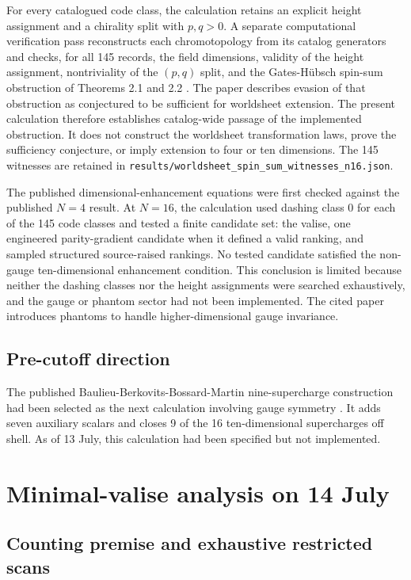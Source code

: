 \documentclass[11pt]{article}
\newcommand{\pathcode}[1]{\nolinkurl{#1}}
\begin{document}
For every catalogued code class, the calculation retains an explicit height
assignment and a chirality split with $p,q>0$.  A separate computational
verification pass reconstructs each chromotopology from its catalog generators
and checks, for all 145 records, the field dimensions, validity of the height
assignment, nontriviality of the $(p,q)$ split, and the Gates-H\"ubsch spin-sum
obstruction of Theorems 2.1 and 2.2 \cite{gates2011}.  The paper describes
evasion of that obstruction as conjectured to be sufficient for worldsheet
extension.  The present calculation therefore establishes catalog-wide passage
of the implemented obstruction.  It does not construct the worldsheet
transformation laws, prove the sufficiency conjecture, or imply extension to
four or ten dimensions.  The 145 witnesses are retained in
\pathcode{results/worldsheet_spin_sum_witnesses_n16.json}.

The published dimensional-enhancement equations \cite{faux2009} were first
checked against the published $N=4$ result.  At $N=16$, the calculation used
dashing class 0 for each of the 145 code classes and tested a finite candidate
set: the valise, one engineered parity-gradient candidate when it defined a
valid ranking, and sampled structured source-raised rankings.  No tested candidate satisfied the
non-gauge ten-dimensional enhancement condition.  This conclusion is limited
because neither the dashing classes nor the height assignments were searched
exhaustively, and the gauge or phantom sector
had not been implemented.  The cited paper introduces phantoms to handle
higher-dimensional gauge invariance.

\subsection{Pre-cutoff direction}

The published Baulieu-Berkovits-Bossard-Martin nine-supercharge construction
had been selected as the next calculation involving gauge symmetry
\cite{baulieu2008}.  It adds seven auxiliary scalars and closes 9 of the 16
ten-dimensional supercharges off shell.  As of 13 July, this calculation had
been specified but not implemented.

\section{Minimal-valise analysis on 14 July}

\subsection{Counting premise and exhaustive restricted scans}
\end{document}
